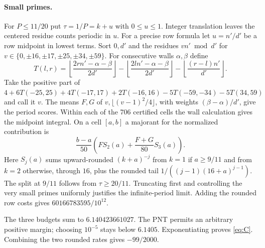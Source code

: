 \documentclass[11pt]{article}
\begin{document}
\paragraph{Small primes.}
For $P\le11/20$ put $\tau=1/P=k+u$ with $0\le u\le1$. Integer
translation leaves the centered residue counts periodic in $u$.
For a precise row formula let $u=n'/d'$ be a row midpoint in lowest
terms. Sort $0,d'$ and the residues $v n'\bmod d'$ for
$v\in\{0,\pm16,\pm17,\pm25,\pm34,\pm59\}$. For consecutive
walls $\alpha,\beta$ define
\[
 T(l,r)=\left\lfloor\frac{2rn'-\alpha-\beta}{2d'}\right\rfloor
 -\left\lfloor\frac{2ln'-\alpha-\beta}{2d'}\right\rfloor
 -\left\lfloor\frac{(r-l)n'}{d'}\right\rfloor .
\]
Take the positive part of $4+6T(-25,25)+4T(-17,17)+2T(-16,16)
-5T(-59,-34)-5T(34,59)$ and call it $v$. The means $F,G$ of
$v,\lfloor(v-1)^2/4\rfloor$, with weights $(\beta-\alpha)/d'$, give
the period scores. Within each of the 706 certified cells the wall
calculation gives the midpoint integral. On a cell $[a,b]$ a majorant
for the normalized contribution is
\[
 \frac{b-a}{50}\left(F S_2(a)+\frac{F+G}{80}S_3(a)\right).
\]
Here $S_j(a)$ sums upward-rounded $(k+a)^{-j}$ from $k=1$ if
$a\ge9/11$ and from $k=2$ otherwise, through $16$, plus the rounded
tail $1/((j-1)(16+a)^{j-1})$. The split at $9/11$ follows from
$\tau\ge20/11$. Truncating first and controlling the very small primes
uniformly justifies the infinite-period limit. Adding the rounded row
costs gives $60166783595/10^{12}$.

The three budgets sum to $6.140423661027$. The PNT permits an arbitrary
positive margin; choosing $10^{-5}$ stays below $6.1405$. Exponentiating
proves \eqref{eq:C}. Combining the two rounded rates gives $-99/2000$.
\end{document}
